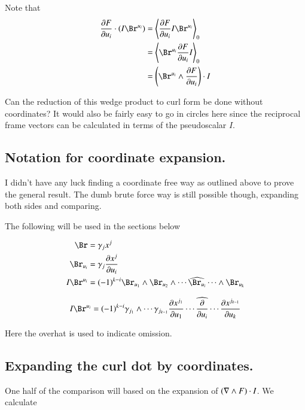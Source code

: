 Note that
\begin{align*}
\PD{u_i}{F} \cdot (I \Br^{u_i})
&= \gpgradezero{\PD{u_i}{F} I \Br^{u_i}} \\
&= \gpgradezero{ \Br^{u_i} \PD{u_i}{F} I } \\
&= \left(\Br^{u_i} \wedge \PD{u_i}{F} \right) \cdot I \\
\end{align*}

Can the reduction of this wedge product to curl form be done without coordinates?  It would also be fairly easy to go in circles here since the reciprocal frame vectors can be calculated in terms of the pseudoscalar $I$.

\subsection{Notation for coordinate expansion. }

I didn't have any luck finding a coordinate free way as outlined above to prove the general result.  The dumb brute force way is still possible though, expanding
both sides and comparing.

The following will be used in the sections below

\begin{align*}
\Br &= \gamma_j x^j \\
\Br_{u_i} &= \gamma_j \PD{u_i}{x^j} \\
I \Br^{u_i}
&= (-1)^{k-i} \Br_{u_1} \wedge \Br_{u_2} \wedge \cdots \widehat{\Br_{u_i}} \cdots \wedge \Br_{u_k} \\
\end{align*}

\begin{equation}\label{eqn:stokesR:dA}
I \Br^{u_i}
= (-1)^{k-i} 
\gamma_{j_1} \wedge \cdots \gamma_{j_{k-1}} 
\PD{u_1}{x^{j_1}} \cdots \widehat{\PD{u_i}{}} \cdots \PD{u_k}{x^{j_{k-1}}}
\end{equation}

Here the overhat is used to indicate omission.

\subsection{Expanding the curl dot by coordinates. }

One half of the comparison will based on the expansion of $(\nabla \wedge F ) \cdot I$.  We calculate

